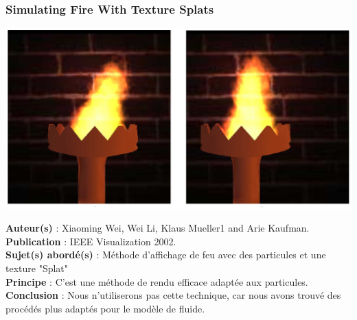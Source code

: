 \documentclass[a4paper,10pt]{article}
\begin{document}
\subsubsection{Simulating Fire With Texture Splats}
    \begin{center}
	\includegraphics[scale=0.3]{Splats.ps}
    \end{center}
\textbf{Auteur(s)} : Xiaoming Wei, Wei Li, Klaus Mueller1 and Arie Kaufman.\\
\textbf{Publication} : IEEE Visualization 2002. \\
\textbf{Sujet(s) abordé(s)} : Méthode d'affichage de feu avec des particules et une texture "Splat"\\ 
\textbf{Principe} : C'est une méthode de rendu efficace adaptée aux particules.\\	
\textbf{Conclusion} : Nous n'utiliserons pas cette technique, car nous avons trouvé des procédés plus adaptés pour le modèle de fluide.\\ 
\end{document}
